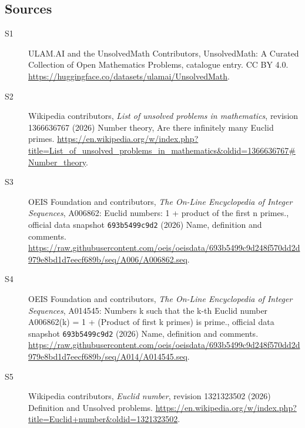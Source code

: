 \documentclass[11pt]{article}
\begin{document}
\subsection{Sources}
\begin{description}
\item[\hypertarget{source:statement:1}{S1}] ULAM.AI and the UnsolvedMath Contributors, UnsolvedMath: A Curated Collection of Open Mathematics Problems, catalogue entry. CC BY 4.0. \url{https://huggingface.co/datasets/ulamai/UnsolvedMath}.
\item[\hypertarget{source:statement:2}{S2}] Wikipedia contributors, \emph{List of unsolved problems in mathematics}, revision 1366636767 (2026) Number theory, Are there infinitely many Euclid primes. \url{https://en.wikipedia.org/w/index.php?title=List_of_unsolved_problems_in_mathematics&oldid=1366636767#Number_theory}.
\item[\hypertarget{source:statement:3}{S3}] OEIS Foundation and contributors, \emph{The On-Line Encyclopedia of Integer Sequences}, A006862: Euclid numbers: 1 + product of the first n primes., official data snapshot \texttt{693b5499c9d2} (2026) Name, definition and comments. \url{https://raw.githubusercontent.com/oeis/oeisdata/693b5499c9d248f570dd2d979e8bd1d7eecf689b/seq/A006/A006862.seq}.
\item[\hypertarget{source:statement:4}{S4}] OEIS Foundation and contributors, \emph{The On-Line Encyclopedia of Integer Sequences}, A014545: Numbers k such that the k-th Euclid number A006862(k) = 1 + (Product of first k primes) is prime., official data snapshot \texttt{693b5499c9d2} (2026) Name, definition and comments. \url{https://raw.githubusercontent.com/oeis/oeisdata/693b5499c9d248f570dd2d979e8bd1d7eecf689b/seq/A014/A014545.seq}.
\item[\hypertarget{source:statement:5}{S5}] Wikipedia contributors, \emph{Euclid number}, revision 1321323502 (2026) Definition and Unsolved problems. \url{https://en.wikipedia.org/w/index.php?title=Euclid+number&oldid=1321323502}.
\end{description}
\label{end:statement}
\end{document}
